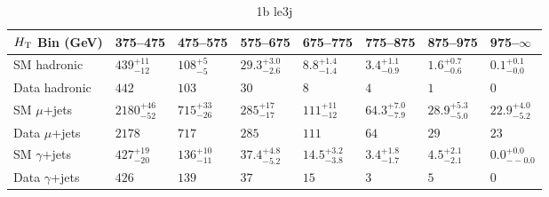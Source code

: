 \documentclass[8pt]{article}
\def\scalht{\mbox{$H_{\rm{T}}$}\xspace}
\newcommand\T{\rule{0pt}{2.6ex}}
\newcommand\B{\rule[-1.2ex]{0pt}{0pt}}
\begin{document}
\begin{table}[ht!]
\caption{1b le3j}
\label{tab:ensemble-1b le3j}
\centering
\begin{tabular}{ llllllll }

\hline
\scalht Bin (GeV)       & 375--475                       & 475--575                       & 575--675                       & 675--775                       & 775--875                       & 875--975                       & 975--$\infty$                  \\ [1.000000ex]
\hline
SM hadronic\T           & $439^{+11}_{-12}$              & $108^{+5}_{-5}$                & $29.3^{+3.0}_{-2.6}$           & $8.8^{+1.4}_{-1.4}$            & $3.4^{+1.1}_{-0.9}$            & $1.6^{+0.7}_{-0.6}$            & $0.1^{+0.1}_{-0.0}$            \\ 
Data hadronic\B         & $442$                          & $103$                          & $30$                           & $8$                            & $4$                            & $1$                            & $0$                            \\ 
\hline
SM $\mu$+jets\T         & $2180^{+46}_{-52}$             & $715^{+33}_{-26}$              & $285^{+17}_{-17}$              & $111^{+11}_{-12}$              & $64.3^{+7.0}_{-7.9}$           & $28.9^{+5.3}_{-5.0}$           & $22.9^{+4.0}_{-5.2}$           \\ 
Data $\mu$+jets\B       & $2178$                         & $717$                          & $285$                          & $111$                          & $64$                           & $29$                           & $23$                           \\ 
\hline
SM $\gamma$+jets\T      & $427^{+19}_{-20}$              & $136^{+10}_{-11}$              & $37.4^{+4.8}_{-5.2}$           & $14.5^{+3.2}_{-3.8}$           & $3.4^{+1.8}_{-1.7}$            & $4.5^{+2.1}_{-2.1}$            & $0.0^{+0.0}_{--0.0}$           \\ 
Data $\gamma$+jets\B    & $426$                          & $139$                          & $37$                           & $15$                           & $3$                            & $5$                            & $0$                            \\ 
\hline

\end{tabular}
\end{table}
\end{document}
